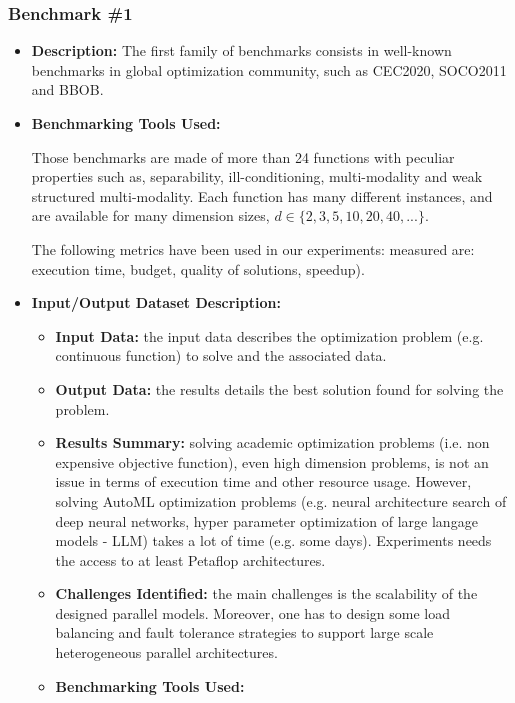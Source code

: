 \subsubsection{Benchmark \#1}
\begin{itemize}
\item \textbf{Description:} The first family of benchmarks consists in well-known benchmarks in global optimization community, such as CEC2020, SOCO2011 and BBOB.

\item \textbf{Benchmarking Tools Used:} 

Those benchmarks are made of more than 24 functions with peculiar properties such as, separability, ill-conditioning, multi-modality and weak structured multi-modality. Each function has many different instances, and are available for many dimension sizes, $d \in  \{ 2,3,5,10,20,40, ... \}$. 

The following metrics have been used in our experiments:  measured are: execution time, budget, quality of solutions, speedup).

\item \textbf{Input/Output Dataset Description:}
\begin{itemize}

\item \textbf{Input Data:} the input data describes the optimization problem (e.g. continuous function) to solve and the associated data. 

\item \textbf{Output Data:} the results details the best solution found for solving the problem. 

\item \textbf{Results Summary:} solving academic optimization problems (i.e. non expensive objective function), even high dimension problems, is not an issue in terms of execution time and other resource usage. However, solving AutoML optimization problems (e.g. neural architecture search of deep neural networks, hyper parameter optimization of large langage models - LLM) takes a lot of time (e.g. some days). Experiments needs the access to at least Petaflop architectures.

\item \textbf{Challenges Identified:} the main challenges is the scalability of the designed parallel models. Moreover, one has to design some load balancing and fault tolerance strategies to support large scale heterogeneous parallel architectures. 


\item \textbf{Benchmarking Tools Used:} 


\end{itemize}
\end{itemize}

